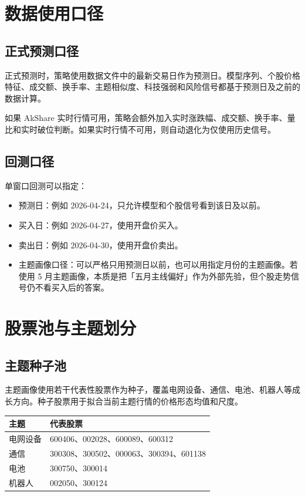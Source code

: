 \documentclass[UTF8,zihao=-4]{ctexart}
\begin{document}
\section{数据使用口径}

\subsection{正式预测口径}

正式预测时，策略使用数据文件中的最新交易日作为预测日。模型序列、个股价格特征、成交额、换手率、主题相似度、科技强弱和风险信号都基于预测日及之前的数据计算。

如果 AkShare 实时行情可用，策略会额外加入实时涨跌幅、成交额、换手率、量比和实时破位判断。如果实时行情不可用，则自动退化为仅使用历史信号。

\subsection{回测口径}

单窗口回测可以指定：

\begin{itemize}
  \item 预测日：例如 2026-04-24，只允许模型和个股信号看到该日及以前。
  \item 买入日：例如 2026-04-27，使用开盘价买入。
  \item 卖出日：例如 2026-04-30，使用开盘价卖出。
  \item 主题画像口径：可以严格只用预测日以前，也可以用指定月份的主题画像。若使用 5 月主题画像，本质是把「五月主线偏好」作为外部先验，但个股走势信号仍不看买入后的答案。
\end{itemize}

\section{股票池与主题划分}

\subsection{主题种子池}

主题画像使用若干代表性股票作为种子，覆盖电网设备、通信、电池、机器人等成长方向。种子股票用于拟合当前主题行情的价格形态均值和尺度。

\begin{longtable}{>{\raggedright\arraybackslash}p{3.5cm} p{10cm}}
\toprule
主题 & 代表股票 \\
\midrule
电网设备 & 600406、002028、600089、600312 \\
通信 & 300308、300502、000063、300394、601138 \\
电池 & 300750、300014 \\
机器人 & 002050、300124 \\
\bottomrule
\end{longtable}
\end{document}
